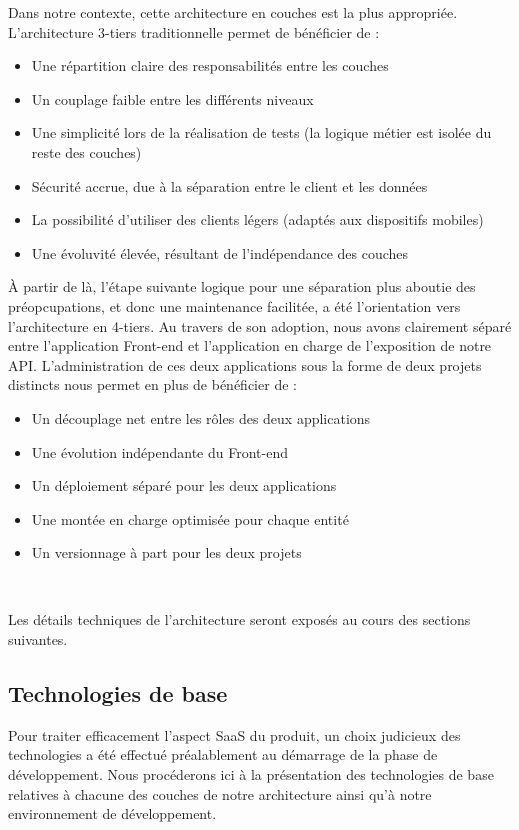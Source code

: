 \begin{spacing}{1.5}
Dans notre contexte, cette architecture en couches est la plus appropriée. L'architecture 3-tiers traditionnelle permet de bénéficier de :

\begin{itemize}
    \item Une répartition claire des responsabilités entre les couches
    \item Un couplage faible entre les différents niveaux
    \item Une simplicité lors de la réalisation de tests (la logique métier est isolée du reste des couches)
    \item Sécurité accrue, due à la séparation entre le client et les données
    \item La possibilité d'utiliser des clients légers (adaptés aux dispositifs mobiles)
    \item Une évoluvité élevée, résultant de l'indépendance des couches
\end{itemize}
À partir de là, l'étape suivante logique pour une séparation plus aboutie des préopcupations, et donc une maintenance facilitée, a été l'orientation vers l'architecture en 4-tiers. Au travers de son adoption, nous avons clairement séparé entre l'application Front-end et l'application en charge de l'exposition de notre API. L'administration de ces deux applications sous la forme de deux projets distincts nous permet en plus de bénéficier de :
\begin{itemize}
    \item Un découplage net entre les rôles des deux applications
    \item Une évolution indépendante du Front-end
    \item Un déploiement séparé pour les deux applications
    \item Une montée en charge optimisée pour chaque entité
    \item Un versionnage à part pour les deux projets
\end{itemize}
\

Les détails techniques de l'architecture seront exposés au cours des sections suivantes.

\subsection{Technologies de base}
Pour traiter efficacement l'aspect SaaS du produit, un choix judicieux des technologies a été effectué préalablement au démarrage de la phase de développement. Nous procéderons ici à la présentation des technologies de base relatives à chacune des couches de notre architecture ainsi qu'à notre environnement de développement.


\end{spacing}
